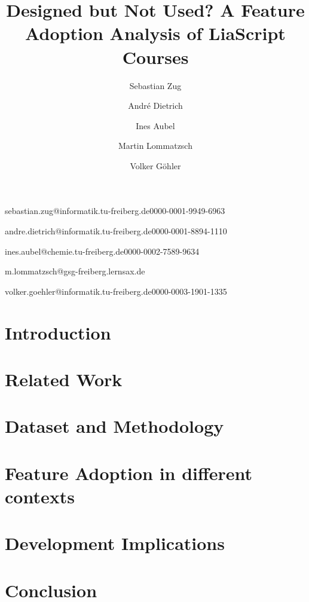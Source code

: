 \documentclass[biblatex, english, anonymous]{lni}
\begin{document}
\title[LiaScript Feature Adoption]{Designed but Not Used? A Feature Adoption Analysis of LiaScript Courses}

\author[1]{Sebastian Zug}{sebastian.zug@informatik.tu-freiberg.de}{0000-0001-9949-6963}
\author[1]{André Dietrich}{andre.dietrich@informatik.tu-freiberg.de}{0000-0001-8894-1110}
\author[2]{Ines Aubel}{ines.aubel@chemie.tu-freiberg.de}{0000-0002-7589-9634}
\author[3]{Martin Lommatzsch}{m.lommatzsch@gsg-freiberg.lernsax.de}{}
\author[1]{Volker Göhler}{volker.goehler@informatik.tu-freiberg.de}{0000-0003-1901-1335}


\maketitle

\begin{abstract}

\end{abstract}


\section{Introduction}
\label{sec:introduction}


\section{Related Work}
\label{sec:background}


\section{Dataset and Methodology}
\label{sec:methodology}


\section{Feature Adoption in different contexts}
\label{sec:adoption}


\section{Development Implications}
\label{sec:implications}


\section{Conclusion}
\label{sec:conclusion}


\printbibliography
\end{document}
